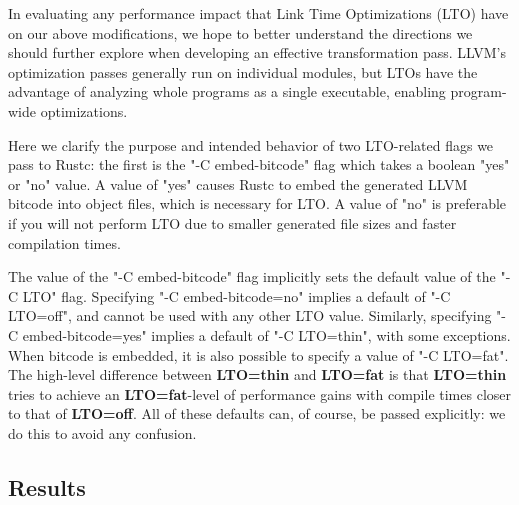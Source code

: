 \documentclass{article}
\begin{document}
In evaluating any performance impact that Link Time Optimizations (LTO) have on our above modifications, we hope to better understand the directions we should further explore when developing an effective transformation pass. 
%
LLVM's optimization passes generally run on individual modules, but LTOs have the advantage of analyzing whole programs as a single executable, enabling program-wide optimizations. 

Here we clarify the purpose and intended behavior of two LTO-related flags we pass to Rustc: the first is the "-C embed-bitcode" flag which takes a boolean "yes" or "no" value. 
%
A value of "yes" causes Rustc to embed the generated LLVM bitcode into object files, which is necessary for LTO.
%
A value of "no" is preferable if you will not perform LTO due to smaller generated file sizes and faster compilation times. 

The value of the "-C embed-bitcode" flag implicitly sets the default value of the "-C LTO" flag. 
%
Specifying "-C embed-bitcode=no" implies a default of "-C LTO=off", and cannot be used with any other LTO value. 
%
Similarly, specifying "-C embed-bitcode=yes" implies a default of "-C LTO=thin", with some exceptions.
%
When bitcode is embedded, it is also possible to specify a value of "-C LTO=fat". 
%
The high-level difference between \textbf{LTO=thin} and \textbf{LTO=fat} is that \textbf{LTO=thin} tries to achieve an \textbf{LTO=fat}-level of performance gains with compile times closer to that of \textbf{LTO=off}. 
%
All of these defaults can, of course, be passed explicitly: we do this to avoid any confusion. 

\subsection{Results}
\label{sec:results}
\medskip
\end{document}
